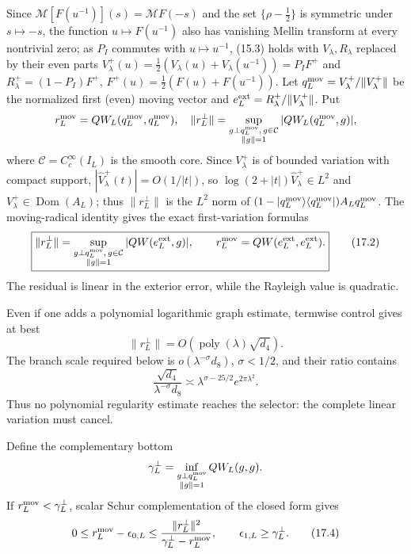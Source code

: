 \documentclass[11pt]{amsart}
\theoremstyle{definition}
\theoremstyle{remark}
\begin{document}
Since \(\mathcal M[F(u^{-1})](s)=\mathcal MF(-s)\) and the set
\(\{\rho-\tfrac12\}\) is symmetric under \(s\mapsto-s\), the function
\(u\mapsto F(u^{-1})\) also has vanishing Mellin transform at every
nontrivial zero; as \(P_I\) commutes with \(u\mapsto u^{-1}\), (15.3) holds
with \(V_\lambda,R_\lambda\) replaced by their even parts
\(V_\lambda^+(u)=\tfrac12(V_\lambda(u)+V_\lambda(u^{-1}))=P_IF^+\) and
\(R_\lambda^+=(1-P_I)F^+\), \(F^+(u)=\tfrac12(F(u)+F(u^{-1}))\).
Let \(q_L^{\rm mov}=V_\lambda^+/\|V_\lambda^+\|\) be the normalized first
(even) moving vector and \(e_L^{\rm ext}=R_\lambda^+/\|V_\lambda^+\|\).  Put
\[
 r_L^{\rm mov}=QW_L(q_L^{\rm mov},q_L^{\rm mov}),
 \quad
 \|r_L^\perp\|=\sup_{\substack{g\perp q_L^{\rm mov},\,g\in\mathcal C\\\|g\|=1}}
 |QW_L(q_L^{\rm mov},g)|,
\]
where \(\mathcal C=C_c^\infty(I_L)\) is the smooth core.  Since
\(V_\lambda^+\) is of bounded variation with compact support,
\(|\widehat V_\lambda^+(t)|=O(1/|t|)\), so
\(\log(2+|t|)\widehat V_\lambda^+\in L^2\) and
\(V_\lambda^+\in\operatorname{Dom}(A_L)\); thus \(\|r_L^\perp\|\) is the
\(L^2\) norm of
\((1-|q_L^{\rm mov}\rangle\langle q_L^{\rm mov}|)A_Lq_L^{\rm mov}\).
The moving-radical identity gives the exact first-variation formulas
\[
 \boxed{
 \|r_L^\perp\|
 =\sup_{\substack{g\perp q_L^{\rm mov},\,g\in\mathcal C\\\|g\|=1}}
 |QW(e_L^{\rm ext},g)|,
 \qquad
 r_L^{\rm mov}=QW(e_L^{\rm ext},e_L^{\rm ext}).}
 \tag{17.2}
\]
The residual is linear in the exterior error, while the Rayleigh value is
quadratic.

Even if one adds a polynomial logarithmic graph estimate, termwise control
gives at best
\[
 \|r_L^\perp\|
 =O(\operatorname{poly}(\lambda)\sqrt{d_4}).
\]
The branch scale required below is \(o(\lambda^{-\sigma}d_8)\),
\(\sigma<1/2\), and their ratio contains
\[
 \frac{\sqrt{d_4}}{\lambda^{-\sigma}d_8}
 \asymp\lambda^{\sigma-25/2}e^{2\pi\lambda^2}.
 \tag{17.3}
\]
Thus no polynomial regularity estimate reaches the selector: the complete
linear variation must cancel.

Define the complementary bottom
\[
 \gamma_L^\perp
 =\inf_{\substack{g\perp q_L^{\rm mov}\\\|g\|=1}}
   QW_L(g,g).
\]
If \(r_L^{\rm mov}<\gamma_L^\perp\), scalar Schur complementation of the
closed form gives
\[
 0\le r_L^{\rm mov}-\epsilon_{0,L}
 \le\frac{\|r_L^\perp\|^2}
          {\gamma_L^\perp-r_L^{\rm mov}},
 \qquad
 \epsilon_{1,L}\ge\gamma_L^\perp.
 \tag{17.4}
\]
\end{document}
